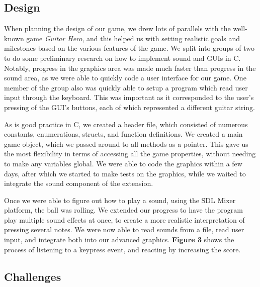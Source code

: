 \documentclass[11pt]{article}
\begin{document}
\subsection{Design}

When planning the design of our game, we drew lots of parallels with the well-known game \emph{Guitar Hero}, and this helped us with setting realistic goals and milestones based on the various features of the game. We split into groups of two to do some preliminary research on how to implement sound and GUIs in C. Notably, progress in the graphics area was made much faster than progress in the sound area, as we were able to quickly code a user interface for our game. One member of the group also was quickly able to setup a program which read user input through the keyboard. This was important as it corresponded to the user's pressing of the GUI's buttons, each of which represented a different guitar string.

\vspace{0.2in}

As is good practice in C, we created a header file, which consisted of numerous constants, enumerations, structs, and function definitions. We created a main game object, which we passed around to all methods as a pointer. This gave us the most flexibility in terms of accessing all the game properties, without needing to make any variables global. We were able to code the graphics within a few days, after which we started to make tests on the graphics, while we waited to integrate the sound component of the extension.

\vspace{0.2in}

Once we were able to figure out how to play a sound, using the SDL Mixer platform, the ball was rolling. We extended our progress to have the program play multiple sound effects at once, to create a more realistic interpretation of pressing several notes. We were now able to read sounds from a file, read user input, and integrate both into our advanced graphics. \textbf{Figure 3} shows the process of listening to a keypress event, and reacting by increasing the score.

\subsection{Challenges}
\end{document}
